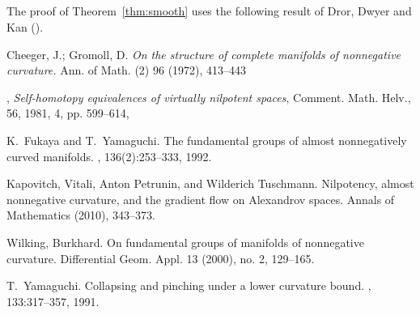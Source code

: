 \documentclass{amsart}
\begin{document}
\subsection{}
The proof of Theorem~\ref{thm:smooth} uses the following result of Dror,  Dwyer and Kan (\cite{DDK}).



\small

%


\begin{thebibliography}{HMR75}

Cheeger, J.; Gromoll, D.
 \textit{On the structure of complete manifolds of nonnegative curvature.}
Ann. of Math. (2) 96 (1972), 413--443

,
 \textit{Self-homotopy equivalences of virtually nilpotent spaces},
{Comment. Math. Helv.},
{56},
{1981},
{4},
pp. {599--614},

K.~Fukaya and T.~Yamaguchi.
\newblock The fundamental groups of almost nonnegatively curved manifolds.
, 136(2):253--333, 1992.


 Kapovitch, Vitali, Anton Petrunin, and Wilderich Tuschmann. 
\newblock Nilpotency, almost nonnegative curvature, and the gradient flow on Alexandrov spaces. 
\newblock Annals of Mathematics (2010), 343--373.

Wilking, Burkhard. \newblock On fundamental groups of manifolds of nonnegative curvature. \newblock  Differential Geom. Appl.  13  (2000),  no. 2, 129--165.

T.~Yamaguchi.
\newblock Collapsing and pinching under a lower curvature bound.
, 133:317--357, 1991.
\end{thebibliography}
\end{document}
